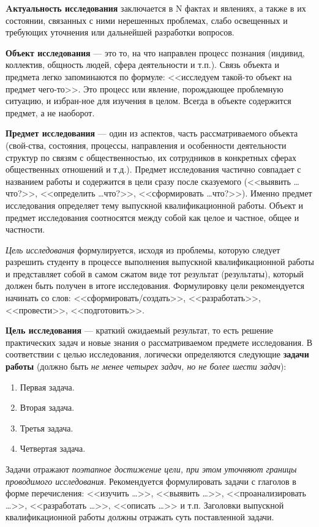 \textbf{Aктуальность исследования} заключается в N фактах и явлениях,  а также в их состоянии, связанных с ними нерешенных проблемах, слабо освещенных и требующих уточнения или дальнейшей разработки вопросов. 

\textbf{Объект исследования} --- это то, на что направлен процесс познания (индивид, коллектив, общность людей, сфера деятельности и т.п.). Связь объекта и предмета легко запоминаются по формуле: <<исследуем такой-то объект на предмет чего-то>>. Это процесс или явление, порождающее проблемную ситуацию, и избран-ное для изучения в целом. Всегда в объекте содержится предмет, а не наоборот. 

\textbf{Предмет исследования} --- один из аспектов, часть рассматриваемого объекта (свой-ства, состояния, процессы, направления и особенности деятельности структур по связям с общественностью, их сотрудников в конкретных сферах общественных отношений и т.д.). Предмет исследования частично совпадает с названием работы и содержится в цели сразу после сказуемого (<<выявить \ldots что?>>, <<определить \ldots что?>>, <<сформировать \ldots что?>>). Именно предмет исследования определяет тему выпускной квалификационной работы.
Объект и предмет исследования соотносятся между собой как целое и частное, общее и частности. 


\textit{Цель исследования} формулируется, исходя из проблемы, которую следует разрешить студенту в процессе выполнения выпускной квалификационной работы и представляет собой в самом сжатом виде тот результат (результаты), который должен быть получен в итоге исследования. Формулировку цели рекомендуется начинать со слов: <<сформировать/создать>>, <<разработать>>, <<провести>>, <<подготовить>>.

\textbf{Цель исследования} --- краткий ожидаемый результат, то есть решение практических задач и новые знания о рассматриваемом предмете исследования. 
В соответствии с целью исследования, логически определяются следующие \textbf{задачи работы} (должно быть \textit{не менее четырех задач, но не более шести задач}):

\begin{enumerate}
	\item Первая задача.
	\item Вторая задача.
	\item Третья задача.
	\item Четвертая задача.
\end{enumerate} 


Задачи отражают \textit{поэтапное достижение цели, при этом уточняют границы проводимого исследования}.
Рекомендуется формулировать задачи с глаголов в форме перечисления: <<изучить \ldots>>, <<выявить \ldots>>, <<проанализировать \ldots>>, <<разработать \ldots>>, <<описать \ldots>> и т.п. Заголовки выпускной квалификационной работы должны отражать суть поставленной задачи.


